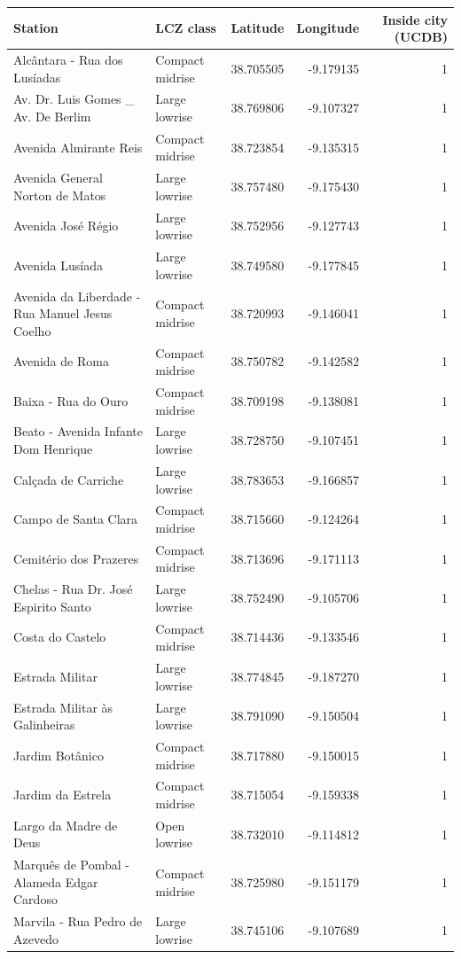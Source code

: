 \begin{tabular}{llrrr}
\toprule
Station & LCZ class & Latitude & Longitude & Inside city (UCDB) \\
\midrule
Alcântara - Rua dos Lusíadas & Compact midrise & 38.705505 & -9.179135 & 1 \\
Av. Dr. Luis Gomes _ Av. De Berlim & Large lowrise & 38.769806 & -9.107327 & 1 \\
Avenida Almirante Reis & Compact midrise & 38.723854 & -9.135315 & 1 \\
Avenida General Norton de Matos & Large lowrise & 38.757480 & -9.175430 & 1 \\
Avenida José Régio & Large lowrise & 38.752956 & -9.127743 & 1 \\
Avenida Lusíada & Large lowrise & 38.749580 & -9.177845 & 1 \\
Avenida da Liberdade - Rua Manuel Jesus Coelho & Compact midrise & 38.720993 & -9.146041 & 1 \\
Avenida de Roma & Compact midrise & 38.750782 & -9.142582 & 1 \\
Baixa - Rua do Ouro & Compact midrise & 38.709198 & -9.138081 & 1 \\
Beato - Avenida Infante Dom Henrique & Large lowrise & 38.728750 & -9.107451 & 1 \\
Calçada de Carriche & Large lowrise & 38.783653 & -9.166857 & 1 \\
Campo de Santa Clara & Compact midrise & 38.715660 & -9.124264 & 1 \\
Cemitério dos Prazeres & Compact midrise & 38.713696 & -9.171113 & 1 \\
Chelas - Rua Dr. José Espirito Santo & Large lowrise & 38.752490 & -9.105706 & 1 \\
Costa do Castelo & Compact midrise & 38.714436 & -9.133546 & 1 \\
Estrada Militar & Large lowrise & 38.774845 & -9.187270 & 1 \\
Estrada Militar às Galinheiras & Large lowrise & 38.791090 & -9.150504 & 1 \\
Jardim Botânico & Compact midrise & 38.717880 & -9.150015 & 1 \\
Jardim da Estrela & Compact midrise & 38.715054 & -9.159338 & 1 \\
Largo da Madre de Deus & Open lowrise & 38.732010 & -9.114812 & 1 \\
Marquês de Pombal - Alameda Edgar Cardoso & Compact midrise & 38.725980 & -9.151179 & 1 \\
Marvila - Rua Pedro de Azevedo & Large lowrise & 38.745106 & -9.107689 & 1 \\

\end{tabular}
